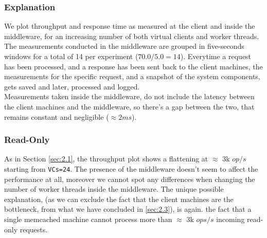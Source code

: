 \documentclass[11pt,a4paper]{article}
\begin{document}
\subsubsection{Explanation}

We plot throughput and response time as measured at the client and inside the middleware, for an increasing number of both virtual clients and  worker threads.\\
The measurements conducted in the middleware are grouped in five-seconds windows for a total of 14 per experiment ($ 70.0 / 5.0 = 14$). Everytime a request has been processed, and a response has been sent back to the client machines, the measurements for the specific request, and a snapshot of the system components, gets saved and later, processed and logged.\\
Measurements taken inside the middleware, do not include the latency between the client machines and the middleware, so there's a gap between the two, that remains constant and negligible ($\approx 2 ms$).

\subsubsection*{Read-Only}

As in Section \ref{sec:2.1}, the throughput plot shows a flattening at $\approx$ 3k $op/s$ starting from \texttt{VCs=24}.  The presence of the middleware doesn't seem to affect the performance at all, moreover we cannot spot any differences when changing the number of worker threads inside the middleware. The unique possible explanation, (as we can exclude the fact that the client machines are the bottleneck, from what we have concluded in \ref{sec:2.3}), is again. the fact that a single memcached machine cannot process more than $\approx$ 3k $ops/s$ incoming read-only requests. 
\end{document}
